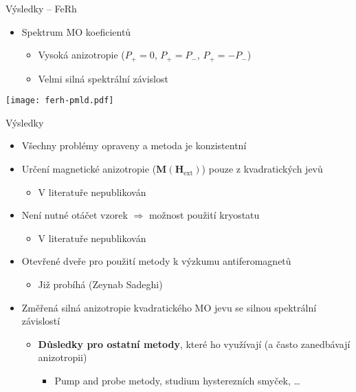 \documentclass{beamer}
\begin{document}
\begin{frame}{Výsledky -- FeRh}
    \begin{itemize}
        \item Spektrum MO koeficientů
            \begin{itemize}
                \item<2-> Vysoká anizotropie ($P_+=0$, $P_+=P_-$, $P_+=-P_-$)
                \item<3-> Velmi silná spektrální závislost
            \end{itemize}
    \end{itemize}
    \texttt{[image: ferh-pmld.pdf]}
\end{frame}

\begin{frame}{Výsledky}
    \begin{itemize}
        \item Všechny problémy opraveny a metoda je konzistentní
            \pause
        \item Určení magnetické anizotropie ($\bm{M}(\bm{H}_{\textrm{ext}})$) pouze z kvadratických jevů
            \begin{itemize}
                \item V literatuře nepublikován
            \end{itemize}
            \pause
        \item Není nutné otáčet vzorek $\Rightarrow$ možnost použití kryostatu
            \begin{itemize}
                \item V literatuře nepublikován
            \end{itemize}
            \pause
        \item Otevřené dveře pro použití metody k výzkumu antiferomagnetů
            \begin{itemize}
                \item Již probíhá (Zeynab Sadeghi)
            \end{itemize}
            \pause
        \item Změřená silná anizotropie kvadratického MO jevu se silnou spektrální závislostí
            \begin{itemize}
                \item \textbf{Důsledky pro ostatní metody}, které ho využívají (a často zanedbávají anizotropii)
                    \begin{itemize}
                        \item Pump and probe metody, studium hysterezních smyček, \ldots
                    \end{itemize}
            \end{itemize}
    \end{itemize}
\end{frame}

\end{document}
